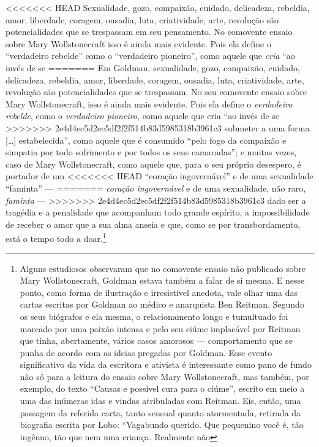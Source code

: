 {<<<<<<< HEAD
Sexualidade, gozo,
compaixão, cuidado, delicadeza, rebeldia, amor, liberdade, coragem,
ousadia, luta, criatividade, arte, revolução são potencialidades que se
trespassam em seu pensamento. No comovente ensaio sobre Mary Wollstonecraft isso é
ainda mais evidente. Pois ela define o ``verdadeiro rebelde'' como o
``verdadeiro pioneiro'', como aquele que \emph{cria} ``ao invés de se
=======
Em Goldman, sexualidade, gozo,
compaixão, cuidado, delicadeza, rebeldia, amor, liberdade, coragem,
ousadia, luta, criatividade, arte, revolução são potencialidades que se
trespassam. No seu comovente ensaio sobre Mary Wollstonecraft, isso é
ainda mais evidente. Pois ela define o \textit{verdadeiro rebelde}, como o
\textit{verdadeiro pioneiro}, como aquele que cria ``ao invés de se
>>>>>>> 2e4d4ec5d2ec5df2f2f514b83d5985318b3961c3
submeter a uma forma {[}\ldots{]} estabelecida'', como aquele que é
consumido ``pelo fogo da compaixão e simpatia por todo sofrimento e por
todos os seus camaradas''; e muitas vezes, caso de Mary Wollstonecraft,
como aquele que, para o seu próprio desespero, é portador de um
<<<<<<< HEAD
``coração ingovernável'' e de uma sexualidade ``faminta'' ---
=======
\textit{coração ingovernável} e de uma sexualidade, não raro, \textit{faminta} ---
>>>>>>> 2e4d4ec5d2ec5df2f2f514b83d5985318b3961c3
dado ser a tragédia e a penalidade que acompanham todo grande espírito,
a impossibilidade de receber o amor que a sua alma anseia e que, como se
por transbordamento, está o tempo todo a doar.\footnote{Alguns
  estudiosos observaram que no comovente ensaio não publicado sobre Mary
  Wollstonecraft, Goldman estava também a falar de si
  mesma. E nesse ponto, como forma de ilustração e irresistível anedota,
  vale olhar uma das cartas escritas por Goldman ao médico e
  anarquista Ben Reitman. Segundo os seus biógrafos e ela mesma, o
  relacionamento longo e tumultuado foi marcado por uma paixão intensa
  e pelo seu ciúme implacável por Reitman que
  tinha, abertamente, vários casos amorosos --- comportamento que se
  punha de acordo com as ideias pregadas por Goldman. Esse evento
  significativo da vida da escritora e ativista é 
  interessante como pano de fundo não só para a leitura do
  ensaio sobre Mary Wollstonecraft, mas também, por exemplo, do texto
  ``Causas e possível cura para o ciúme'', escrito em meio a
  uma das inúmeras idas e vindas atribuladas com Reitman. Eis, então,
  uma passagem da referida carta, tanto sensual quanto atormentada,
  retirada da biografia escrita por Lobo: ``Vagabundo querido. Que
  pequenino você é, tão ingênuo, tão que nem uma criança. Realmente não
}}
